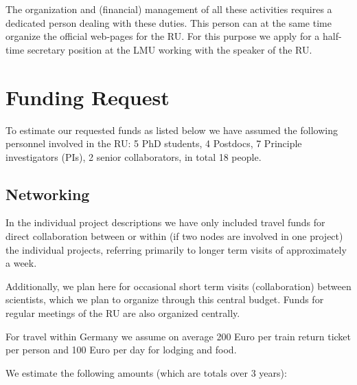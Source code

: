 \documentclass[10pt,fleqn,twoside]{article}
\begin{document}
The organization and (financial) management of all these activities requires
a dedicated person dealing with these duties. This person can at the same
time organize the official web-pages for the RU.  For this purpose we apply
for a half-time secretary position at the LMU working with the speaker of
the RU.
%
\section{Funding Request}
%
To estimate our requested funds as listed below we have assumed the
following personnel involved in the RU: 5 PhD students, 4 Postdocs, 7
Principle investigators (PIs), 2 senior collaborators, in total 18 people.

\subsection{Networking}
In the individual project descriptions we have only included travel funds
for direct collaboration between or within (if two nodes are involved in one
project) the individual projects, referring primarily to longer term visits
of approximately a week.

Additionally, we plan here for  occasional short term visits
(collaboration) between scientists, which we plan to organize through this
central budget. Funds for regular meetings of the RU are also organized
centrally. 

For travel within Germany we assume on average 200 Euro per train return ticket
per person and 100 Euro per day for lodging and food. 

We estimate the following amounts (which are totals over 3 years):
\end{document}
